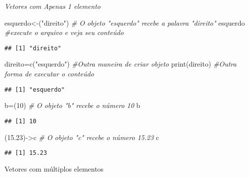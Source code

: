 \documentclass[
]{book}
\newenvironment{Shaded}{\begin{snugshade}}{\end{snugshade}}
\newcommand{\CommentTok}[1]{\textcolor[rgb]{0.56,0.35,0.01}{\textit{#1}}}
\newcommand{\DecValTok}[1]{\textcolor[rgb]{0.00,0.00,0.81}{#1}}
\newcommand{\FloatTok}[1]{\textcolor[rgb]{0.00,0.00,0.81}{#1}}
\newcommand{\FunctionTok}[1]{\textcolor[rgb]{0.00,0.00,0.00}{#1}}
\newcommand{\NormalTok}[1]{#1}
\newcommand{\OtherTok}[1]{\textcolor[rgb]{0.56,0.35,0.01}{#1}}
\newcommand{\StringTok}[1]{\textcolor[rgb]{0.31,0.60,0.02}{#1}}
\begin{document}
\emph{Vetores com Apenas 1 elemento}

\begin{Shaded}
\begin{Highlighting}[]
\NormalTok{esquerdo}\OtherTok{\textless{}{-}}\NormalTok{(}\StringTok{"direito"}\NormalTok{) }\CommentTok{\# O objeto "esquerdo" recebe a palavra "direito"}
\NormalTok{esquerdo }\CommentTok{\#execute o arquivo e veja seu conteúdo}
\end{Highlighting}
\end{Shaded}

\begin{verbatim}
## [1] "direito"
\end{verbatim}

\begin{Shaded}
\begin{Highlighting}[]
\NormalTok{direito}\OtherTok{=}\FunctionTok{c}\NormalTok{(}\StringTok{"esquerdo"}\NormalTok{) }\CommentTok{\#Outra maneira de criar objeto  }
\FunctionTok{print}\NormalTok{(direito) }\CommentTok{\#Outra forma de executar o conteúdo}
\end{Highlighting}
\end{Shaded}

\begin{verbatim}
## [1] "esquerdo"
\end{verbatim}

\begin{Shaded}
\begin{Highlighting}[]
\NormalTok{b}\OtherTok{=}\NormalTok{(}\DecValTok{10}\NormalTok{) }\CommentTok{\# O objeto "b" recebe o número 10}
\NormalTok{b}
\end{Highlighting}
\end{Shaded}

\begin{verbatim}
## [1] 10
\end{verbatim}

\begin{Shaded}
\begin{Highlighting}[]
\NormalTok{(}\FloatTok{15.23}\NormalTok{)}\OtherTok{{-}\textgreater{}}\NormalTok{c }\CommentTok{\# O objeto "c" recebe o número 15.23}
\NormalTok{c}
\end{Highlighting}
\end{Shaded}

\begin{verbatim}
## [1] 15.23
\end{verbatim}

Vetores com múltiplos elementos
\end{document}
